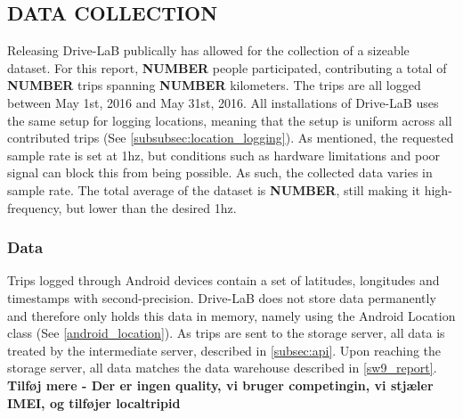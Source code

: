 \subsection{DATA COLLECTION}\label{sec:datacollection}
Releasing Drive-LaB publically has allowed for the collection of a sizeable dataset. For this report, \textbf{NUMBER} people participated, contributing a total of \textbf{NUMBER} trips spanning \textbf{NUMBER} kilometers. The trips are all logged between May 1st, 2016 and May 31st, 2016. All installations of Drive-LaB uses the same setup for logging locations, meaning that the setup is uniform across all contributed trips (See \ref{subsubsec:location_logging}). As mentioned, the requested sample rate is set at 1hz, but conditions such as hardware limitations and poor signal can block this from being possible. As such, the collected data varies in sample rate. The total average of the dataset is \textbf{NUMBER}, still making it high-frequency, but lower than the desired 1hz.

\subsubsection{Data}\label{subsec:data}
Trips logged through Android devices contain a set of latitudes, longitudes and timestamps with second-precision. Drive-LaB does not store data permanently and therefore only holds this data in memory, namely using the Android Location class (See \ref{android_location}). As trips are sent to the storage server, all data is treated by the intermediate server, described in \ref{subsec:api}. Upon reaching the storage server, all data matches the data warehouse described in \ref{sw9_report}. \textbf{Tilføj mere - Der er ingen quality, vi bruger competingin, vi stjæler IMEI, og tilføjer localtripid} 